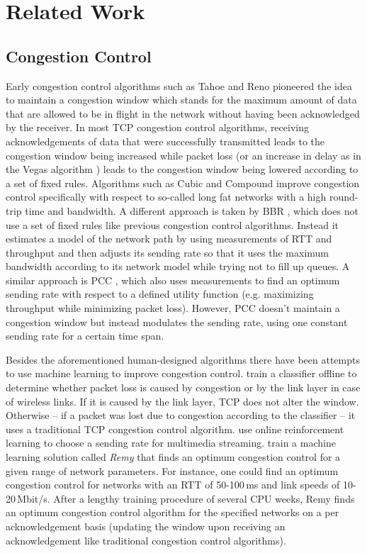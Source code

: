 \documentclass[10pt,sigconf,anonymous]{acmart}
\begin{document}
\section{Related Work}

\subsection{Congestion Control}

Early congestion control algorithms such as Tahoe and Reno \cite{jacobson_congestion_1988} pioneered the idea to maintain a congestion window which stands for the maximum amount of data that are allowed to be in flight in the network without having been acknowledged by the receiver. In most TCP congestion control algorithms, receiving acknowledgements of data that were successfully transmitted leads to the congestion window being increased while packet loss (or an increase in delay as in the Vegas algorithm \cite{brakmo_tcp_1995}) leads to the congestion window being lowered according to a set of fixed rules. Algorithms such as Cubic and Compound \cite{ha_cubic:_2008, tan_compound_2006} improve congestion control specifically with respect to so-called long fat networks with a high round-trip time and bandwidth. A different approach is taken by BBR \cite{cardwell_bbr:_2016}, which does not use a set of fixed rules like previous congestion control algorithms. Instead it estimates a model of the network path by using measurements of RTT and throughput and then adjusts its sending rate so that it uses the maximum bandwidth according to its network model while trying not to fill up queues. A similar approach is PCC \cite{dong_pcc:_2015}, which also uses measurements to find an optimum sending rate with respect to a defined utility function (e.g. maximizing throughput while minimizing packet loss). However, PCC doesn't maintain a congestion window but instead modulates the sending rate, using one constant sending rate for a certain time span.

Besides the aforementioned human-designed algorithms there have been attempts to use machine learning to improve congestion control. \citet{geurts_machine_2004} train a classifier offline to determine whether packet loss is caused by congestion or by the link layer in case of wireless links. If it is caused by the link layer, TCP does not alter the window. Otherwise -- if a packet was lost due to congestion according to the classifier -- it uses a traditional TCP congestion control algorithm. \citet{shaio_reinforcement_2005} use online reinforcement learning to choose a sending rate for multimedia streaming. \citet{winstein_tcp_2013} train a machine learning solution called \textit{Remy} that finds an optimum congestion control for a given range of network parameters. For instance, one could find an optimum congestion control for networks with an RTT of 50-100\,ms and link speeds of 10-20\,Mbit/s. After a lengthy training procedure of several CPU weeks, Remy finds an optimum congestion control algorithm for the specified networks on a per acknowledgement basis (updating the window upon receiving an acknowledgement like traditional congestion control algorithms). 
\end{document}
